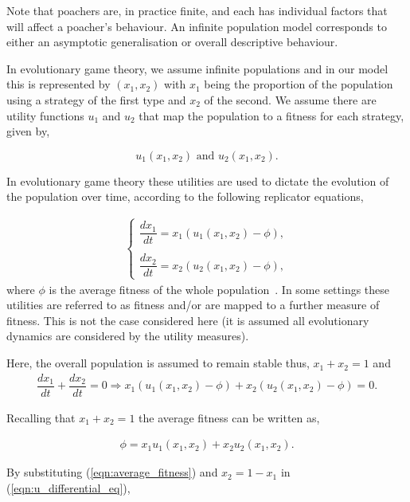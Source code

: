 \documentclass[10pt]{article}
\begin{document}
Note that poachers are, in practice finite, and each has individual factors that will
affect a poacher's behaviour. An infinite population model corresponds to either
an asymptotic generalisation or overall descriptive behaviour.

In evolutionary game theory, we assume infinite populations and in our
model this is represented by \((x_1, x_2)\) with \(x_1\) being the proportion
of the population using a strategy of the first type and \(x_2\) of the second. We
assume there are utility functions \(u_1\) and \(u_2\) that map the population
to a fitness for each strategy, given by,

\[ u_1(x_1, x_2)  \text{ and } u_2(x_1, x_2).\]

In evolutionary game theory these utilities are used to dictate the evolution of
the population over time, according to the following replicator equations,

\begin{eqnarray}
    \label{eqn:u_differential_eq}
    \left\{
    \begin{array}{cl}
    \dfrac{dx_1}{dt}=x_1(u_1(x_1, x_2)-\phi),
    \\
    \\
    \dfrac{dx_2}{dt}= x_2(u_2(x_1, x_2)-\phi),
    \end{array} \right.
\end{eqnarray}
where \(\phi\) is the average fitness of the whole population~\cite{nowak2006evolutionary}.
In some settings these utilities are referred to as fitness and/or are mapped to
a further measure of fitness. This is not the case considered here (it is
assumed all evolutionary dynamics are considered by the utility measures).

Here, the overall
population is assumed to remain stable thus, \(x_1 + x_2 = 1 \) and
\begin{eqnarray}
    \dfrac{dx_1}{dt}  + \dfrac{dx_2}{dt} = 0 \Rightarrow x_1(u_1(x_1, x_2) - \phi)
     + x_2(u_2(x_1, x_2) - \phi)=0.
\end{eqnarray}

Recalling that \(x_1 + x_2 = 1\) the average fitness can be written as,

\begin{eqnarray}
\label{eqn:average_fitness}
    \phi=x_1u_1(x_1, x_2) + x_2u_2(x_1, x_2).
\end{eqnarray}

\noindent{} By substituting (\ref{eqn:average_fitness}) and \(x_2= 1 - x_1\)
in (\ref{eqn:u_differential_eq}),
\end{document}
